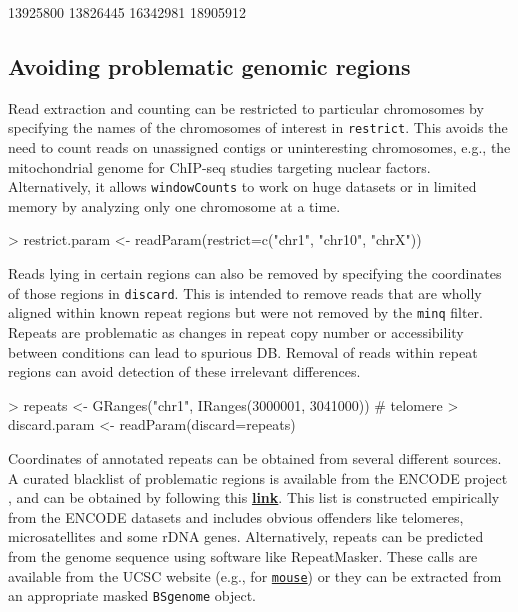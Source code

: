 \documentclass[12pt]{report}
\renewenvironment{Schunk}{\vspace{0pt}}{\vspace{0pt}}
\newcommand{\code}[1]{{\small\texttt{#1}}}
\begin{document}
\begin{Schunk}
\begin{Soutput}
[1] 13925800 13826445 16342981 18905912
\end{Soutput}
\end{Schunk}

\subsection{Avoiding problematic genomic regions}
Read extraction and counting can be restricted to particular chromosomes by specifying the names of the chromosomes of interest in \code{restrict}. 
This avoids the need to count reads on unassigned contigs or uninteresting chromosomes, e.g., the mitochondrial genome for ChIP-seq studies targeting nuclear factors. 
Alternatively, it allows \code{windowCounts} to work on huge datasets or in limited memory by analyzing only one chromosome at a time.

\begin{Schunk}
\begin{Sinput}
> restrict.param <- readParam(restrict=c("chr1", "chr10", "chrX"))
\end{Sinput}
\end{Schunk}

Reads lying in certain regions can also be removed by specifying the coordinates of those regions in \code{discard}. 
This is intended to remove reads that are wholly aligned within known repeat regions but were not removed by the \code{minq} filter. 
Repeats are problematic as changes in repeat copy number or accessibility between conditions can lead to spurious DB. 
Removal of reads within repeat regions can avoid detection of these irrelevant differences. 

\begin{Schunk}
\begin{Sinput}
> repeats <- GRanges("chr1", IRanges(3000001, 3041000)) # telomere
> discard.param <- readParam(discard=repeats)
\end{Sinput}
\end{Schunk}

Coordinates of annotated repeats can be obtained from several different sources.
A curated blacklist of problematic regions is available from the ENCODE project \citep{dunham2012}, and can be obtained by following this \href{https://sites.google.com/site/anshulkundaje/projects/blacklists}{\textbf{link}}.
This list is constructed empirically from the ENCODE datasets and includes obvious offenders like telomeres, microsatellites and some rDNA genes.
Alternatively, repeats can be predicted from the genome sequence using software like RepeatMasker.
These calls are available from the UCSC website (e.g., for \href{hgdownload.soe.ucsc.edu/goldenPath/mm10/bigZips/chromOut.tar.gz}{\texttt{mouse}}) or they can be extracted from an appropriate masked \code{BSgenome} object. 
\end{document}
